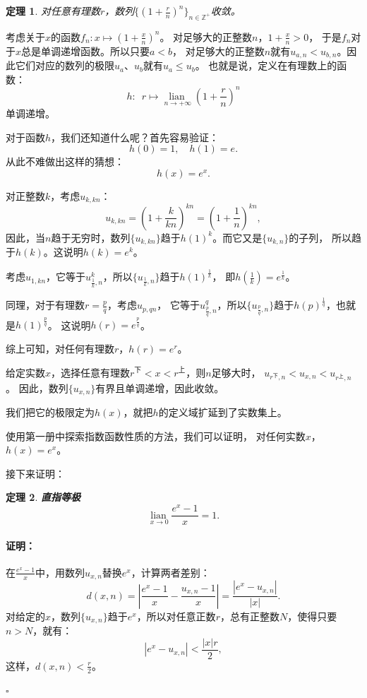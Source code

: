 \documentclass[12pt,UTF8]{ctexbook}
\newcommand{\lian}[1]{
    \underset{#1}{\operatorname{lian}\,}
}
\renewenvironment{proof}{\paragraph{\textbf{证明：}}}{\hfill$\square$}
\newtheorem{tm}{定理}[section]
\begin{document}
\begin{appendix}
\begin{tm}\label{tm:b-1-40}
    对任意有理数$r$，数列$\{\left(1 + \frac{r}{n}\right)^n\}_{n\in\mathbb{Z}^+}$收敛。
\end{tm}

考虑关于$x$的函数$f_{n} : x \mapsto \left(1 + \frac{x}{n}\right)^n $。
对足够大的正整数$n$，$1 + \frac{x}{n} > 0$， 于是$f_n$对于$x$总是单调递增函数。所以只要$a < b$，
对足够大的正整数$n$就有$u_{a,n} < u_{b,n}$。因此它们对应的数列的极限$u_a$、$u_b$就有$u_a \leqslant u_b$。
也就是说，定义在有理数上的函数：
$$ h: \,\,\, r \mapsto \lian{n\to +\infty}  \left(1 + \frac{r}{n}\right)^n $$
单调递增。

对于函数$h$，我们还知道什么呢？首先容易验证：
$$ h(0) = 1, \quad h(1) = e.$$ 
从此不难做出这样的猜想：
$$ h(x) = e^x. $$

对正整数$k$，考虑$u_{k,kn}$：
$$ u_{k,kn} = \left(1 + \frac{k}{kn}\right)^{kn} = \left(1 + \frac{1}{n}\right)^{kn}, $$
因此，当$n$趋于无穷时，数列$\{u_{k,kn}\}$趋于$h(1)^k$。而它又是$\{u_{k,n}\}$的子列，
所以趋于$h(k)$。这说明$h(k) = e^k$。

考虑$u_{1,kn}$，它等于$u_{\frac{1}{k},n}^k$，所以$\{u_{\frac{1}{k},n}\}$趋于$h(1)^{\frac{1}{k}}$，
即$h(\frac{1}{k}) = e^{\frac{1}{k}}$。

同理，对于有理数$r = \frac{p}{q}$，考虑$u_{p,qn}$，
它等于$u_{\frac{p}{q},n}^q$，所以$\{u_{\frac{p}{q},n}\}$趋于$h(p)^{\frac{1}{q}}$，也就是$h(1)^{\frac{p}{q}}$。
这说明$h(r) = e^{\frac{p}{q}}$。

综上可知，对任何有理数$r$，$h(r) = e^r$。

给定实数$x$，选择任意有理数$r^{\text{下}} < x < r^{\text{上}}$，则$n$足够大时，
$u_{r^\text{下},n} < u_{x,n} < u_{r^\text{上},n}$。
因此，数列$\{u_{x,n}\}$有界且单调递增，因此收敛。

我们把它的极限定为$h(x)$，就把$h$的定义域扩延到了实数集上。

使用第一册中探索指数函数性质的方法，我们可以证明，
对任何实数$x$，$h(x) = e^x$。

接下来证明：
\begin{tm}{\textbf{直指等极}}\label{tm:b-1-50}
    $$\lian{x\to 0} \frac{e^x - 1}{x} = 1.$$
\end{tm}

\begin{proof}
    在$\frac{e^x - 1}{x}$中，用数列$u_{x,n}$替换$e^x$，计算两者差别：
    $$ d(x, n) = \left|\frac{e^x - 1}{x} - \frac{u_{x,n} - 1}{x}\right| = \frac{\left|e^x - u_{x,n}\right|}{\left|x\right|}. $$
    对给定的$x$，数列$\{u_{x,n}\}$趋于$e^x$，所以对任意正数$r$，总有正整数$N$，使得只要$n>N$，就有：
    $$ \left|e^x - u_{x,n}\right| < \frac{|x|r}{2},$$
    这样，$d(x, n) < \frac{r}{2}$。


\end{proof}
\end{appendix}
\end{document}
